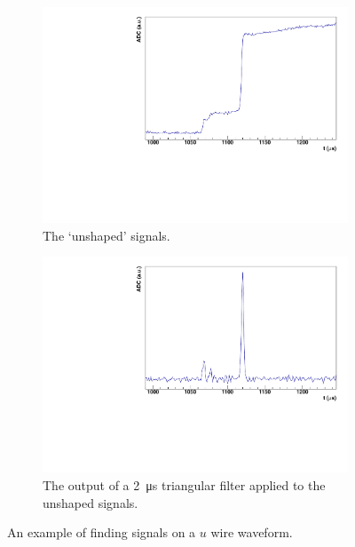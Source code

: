 \documentclass[herrin-thesis.tex]{subfiles}
\begin{document}
\begin{figure}[tbp]
\begin{subfigure}[t]{0.48\textwidth}
		\centering
		\includegraphics[width=\textwidth]{./plots/data_signal_finding_unshaped.pdf}
		\caption[Unshaped signals]{The `unshaped' signals.}
		\label{fig:data_signal_finding_unshaped}
	\end{subfigure}\hfill%
	\begin{subfigure}[t]{0.48\textwidth}
		\centering
		\includegraphics[width=\textwidth]{./plots/data_signal_finding_msf.pdf}
		\caption[Multiple signal finger output]{The output of a \SI{2}{\micro\s} triangular filter applied to the unshaped signals.}
		\label{fig:data_signal_finding_msf}
	\end{subfigure}
	\caption[The signal-finding process]{An example of finding signals on a \(u\) wire waveform.}
	\label{fig:data_signal_finding}
\end{figure}
\end{document}

